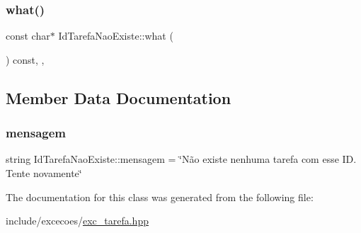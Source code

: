\subsubsection{\texorpdfstring{what()}{what()}}
{\footnotesize\ttfamily const char$\ast$ Id\+Tarefa\+Nao\+Existe\+::what (\begin{DoxyParamCaption}{ }\end{DoxyParamCaption}) const\hspace{0.3cm}{\ttfamily [inline]}, {\ttfamily [override]}, {\ttfamily [noexcept]}}



\subsection{Member Data Documentation}
\mbox{\label{classIdTarefaNaoExiste_a139ea7adf62da317199adb6c77fb95bf}} 
\subsubsection{\texorpdfstring{mensagem}{mensagem}}
{\footnotesize\ttfamily string Id\+Tarefa\+Nao\+Existe\+::mensagem = \char`\"{}Não existe nenhuma tarefa com esse I\+D. Tente novamente\char`\"{}\hspace{0.3cm}{\ttfamily [private]}}



The documentation for this class was generated from the following file\+:\begin{DoxyCompactItemize}
\item 
include/excecoes/\hyperlink{exc__tarefa_8hpp}{exc\+\_\+tarefa.\+hpp}\end{DoxyCompactItemize}
